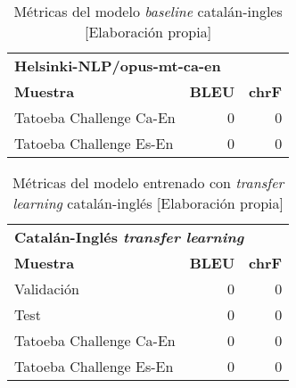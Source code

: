 \begin{table}[H]
    \begin{center}
        \begin{tabular}{ l r r }
        \multicolumn{3}{l}{\textbf{Helsinki-NLP/opus-mt-ca-en}}\\
        \textbf{Muestra} & \textbf{BLEU} & \textbf{chrF} \\
        Tatoeba Challenge Ca-En & 0 & 0 \\
        Tatoeba Challenge Es-En & 0 & 0
        \end{tabular}
        \caption{Métricas del modelo \textit{baseline} catalán-ingles [Elaboración propia]}\label{transferorigcaen}
    \end{center}
\end{table}

\begin{table}[H]
    \begin{center}
        \begin{tabular}{ l r r }
        \multicolumn{3}{l}{\textbf{Catalán-Inglés \textit{transfer learning}}}\\
        \textbf{Muestra} & \textbf{BLEU} & \textbf{chrF} \\
        Validación & 0 & 0 \\
        Test & 0 & 0 \\
        Tatoeba Challenge Ca-En & 0 & 0 \\
        Tatoeba Challenge Es-En & 0 & 0
        \end{tabular}
        \caption{Métricas del modelo entrenado con \textit{transfer learning} catalán-inglés [Elaboración propia]}\label{transfercaen}
    \end{center}
\end{table}

